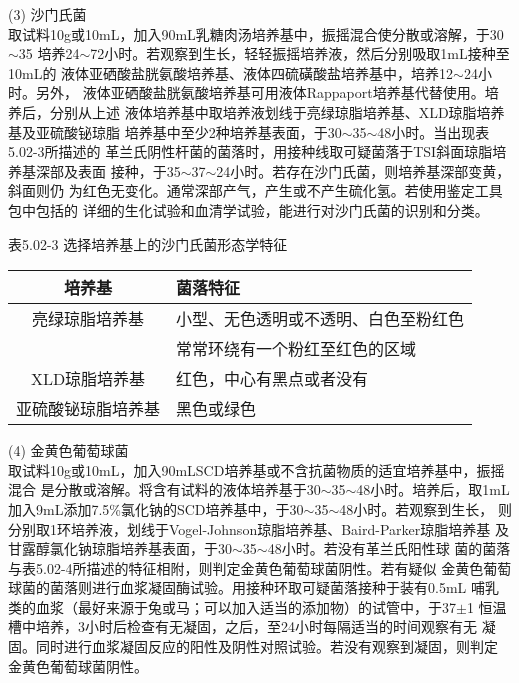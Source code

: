 \documentclass[11pt,a4paper]{article}
\newenvironment{SC}{%
  \CJKfamily{gbsn}%
  \CJKtilde
  \CJKnospace}{}
\begin{document}
\begin{CJK}{UTF8}{}
\begin{SC}
(3) 沙门氏菌\\

取试料10g或10mL，加入90mL乳糖肉汤培养基中，振摇混合使分散或溶解，于30$\sim$35\textcelsius
培养24$\sim$72小时。若观察到生长，轻轻振摇培养液，然后分别吸取1mL接种至10mL的
液体亚硒酸盐胱氨酸培养基、液体四硫磺酸盐培养基中，培养12$\sim$24小时。另外，
液体亚硒酸盐胱氨酸培养基可用液体Rappaport培养基代替使用。培养后，分别从上述
液体培养基中取培养液划线于亮绿琼脂培养基、XLD琼脂培养基及亚硫酸铋琼脂
培养基中至少2种培养基表面，于30$\sim$35$\sim$48小时。当出现表5.02-3所描述的
革兰氏阴性杆菌的菌落时，用接种线取可疑菌落于TSI斜面琼脂培养基深部及表面
接种，于35$\sim$37$\sim$24小时。若存在沙门氏菌，则培养基深部变黄，斜面则仍
为红色无变化。通常深部产气，产生或不产生硫化氢。若使用鉴定工具包中包括的
详细的生化试验和血清学试验，能进行对沙门氏菌的识别和分类。\\

\begin{table}[htb]
\begin{center}
表5.02-3 选择培养基上的沙门氏菌形态学特征\\
\begin{tabular}{c|l}
\hline
培养基&菌落特征\\
\hline
亮绿琼脂培养基&小型、无色透明或不透明、白色至粉红色\\
&常常环绕有一个粉红至红色的区域\\
\hline
XLD琼脂培养基&红色，中心有黑点或者没有\\
\hline
亚硫酸铋琼脂培养基&黑色或绿色\\
\hline
\end{tabular}
\end{center}
\end{table}

(4) 金黄色葡萄球菌\\

取试料10g或10mL，加入90mLSCD培养基或不含抗菌物质的适宜培养基中，振摇混合
是分散或溶解。将含有试料的液体培养基于30$\sim$35$\sim$48小时。培养后，取1mL
加入9mL添加7.5\%氯化钠的SCD培养基中，于30$\sim$35$\sim$48小时。若观察到生长，
则分别取1环培养液，划线于Vogel-Johnson琼脂培养基、Baird-Parker琼脂培养基
及甘露醇氯化钠琼脂培养基表面，于30$\sim$35$\sim$48小时。若没有革兰氏阳性球
菌的菌落与表5.02-4所描述的特征相附，则判定金黄色葡萄球菌阴性。若有疑似
金黄色葡萄球菌的菌落则进行血浆凝固酶试验。用接种环取可疑菌落接种于装有0.5mL
哺乳类的血浆（最好来源于兔或马；可以加入适当的添加物）的试管中，于37$\pm$1\textcelsius
恒温槽中培养，3小时后检查有无凝固，之后，至24小时每隔适当的时间观察有无
凝固。同时进行血浆凝固反应的阳性及阴性对照试验。若没有观察到凝固，则判定
金黄色葡萄球菌阴性。\\


\end{SC}
\end{CJK}
\end{document}
